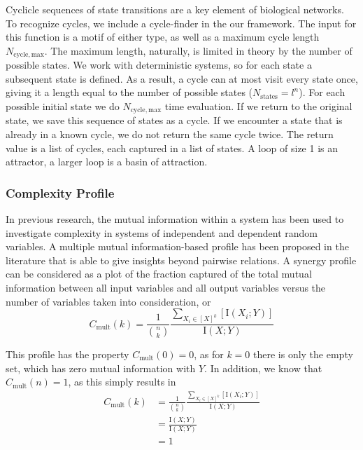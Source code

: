 \documentclass[../main.tex]{subfiles}
\begin{document}
Cyclicle sequences of state transitions are a key element of biological networks. %
To recognize cycles, we include a cycle-finder in the our framework.
The input for this function is a motif of either type, as well as a maximum cycle length $N_\mathrm{cycle,max}$.
The maximum length, naturally, is limited in theory by the number of possible states.
We work with deterministic systems, so for each state a subsequent state is defined.
As a result, a cycle can at most visit every state once, giving it a length equal to the number of possible states ($N_\mathrm{states} = l^n$).
For each possible initial state we do $N_\mathrm{cycle,max}$ time evaluation.
If we return to the original state, we save this sequence of states as a cycle.
If we encounter a state that is already in a known cycle, we do not return the same cycle twice.
The return value is a list of cycles, each captured in a list of states.
A loop of size 1 is an attractor, a larger loop is a basin of attraction.

\subsubsection{Complexity Profile}

In previous research, the mutual information within a system has been used to investigate complexity in systems of independent and dependent random variables.
A multiple mutual information-based profile has been proposed in the literature that is able to give insights beyond pairwise relations.
A synergy profile can be considered as a plot of the fraction captured of the total mutual information between all input variables and all output variables versus the number of variables taken into consideration, or
%
\begin{equation}
C_\mathrm{mult}(k) = \frac{1}{\binom{n}{k}}\frac{\sum_{X_i \in [X]^k} [\mathrm{I}(X_i;Y)]}{\mathrm{I}(X;Y)}
\end{equation}

This profile has the property $C_\mathrm{mult}(0) = 0$, as for $k = 0$ there is only the empty set, which has zero mutual information with $Y$.
In addition, we know that $C_\mathrm{mult}(n) = 1$, as this simply results in
%
\begin{align}
C_\mathrm{mult}(k) 
&= \frac{1}{\binom{n}{k}}\frac{\sum_{X_i \in [X]^k} [\mathrm{I}(X_i;Y)]}{\mathrm{I}(X;Y)} \\
&= \frac{\mathrm{I}(X;Y)}{\mathrm{I}(X;Y)} \\
&= 1
\end{align}
\end{document}
